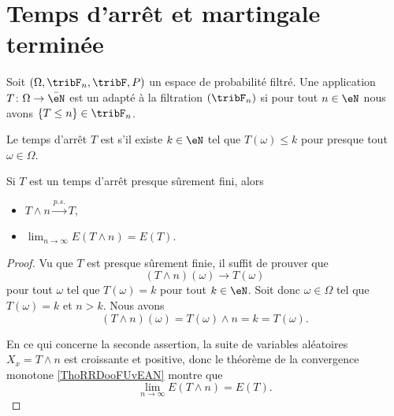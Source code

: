 \section{Temps d'arrêt et martingale terminée}

\begin{definition}
    Soit \( (\Omega,\tribF_n,\tribF,P)\) un espace de probabilité filtré. Une application \( T\colon \Omega\to \bar \eN\) est un  adapté à la filtration \( (\tribF_n)\) si pour tout \( n\in \eN\) nous avons \( \{ T\leq n \}\in\tribF_n\).

    Le temps d'arrêt $T$ est  s'il existe \( k\in \eN\) tel que \( T(\omega)\leq k\) pour presque tout \( \omega\in \Omega\).
\end{definition}

\begin{lemma} \label{LemXYeCLXW}
    Si \( T\) est un temps d'arrêt presque sûrement fini, alors
    \begin{itemize}
        \item \( T\wedge n\stackrel{p.s.}{\longrightarrow}T\),
        \item   \label{ItemIPPkxmAii}
            \( \lim_{n\to \infty}  E(T\wedge n)=E(T)\).
    \end{itemize}
\end{lemma}

\begin{proof}
    Vu que \( T \) est presque sûrement finie, il suffit de prouver que
    \begin{equation}    \label{EqRVoKxsN}
        (T\wedge n)(\omega)\to T(\omega)
    \end{equation}
    pour tout \( \omega\) tel que \( T(\omega)=k\) pour tout \( k\in \eN\). Soit donc \( \omega\in \Omega\) tel que \( T(\omega)=k\) et \( n>k\). Nous avons
    \begin{equation}
        (T\wedge n)(\omega)=T(\omega)\wedge n=k=T(\omega).
    \end{equation}

    En ce qui concerne la seconde assertion, la suite de variables aléatoires \( X_x=T\wedge n\) est croissante et positive, donc le théorème de la convergence monotone \ref{ThoRRDooFUvEAN} montre que
    \begin{equation}
        \lim_{n\to \infty}E(T\wedge n)=E(T).
    \end{equation}
\end{proof}

